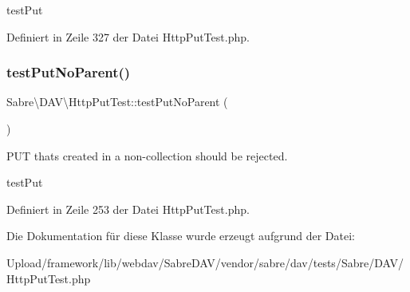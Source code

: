 test\+Put 

Definiert in Zeile 327 der Datei Http\+Put\+Test.\+php.

\mbox{\label{class_sabre_1_1_d_a_v_1_1_http_put_test_ac2a7f4b6ffdf26168d1862c2ba65669e}} 
\subsubsection{\texorpdfstring{test\+Put\+No\+Parent()}{testPutNoParent()}}
{\footnotesize\ttfamily Sabre\textbackslash{}\+D\+A\+V\textbackslash{}\+Http\+Put\+Test\+::test\+Put\+No\+Parent (\begin{DoxyParamCaption}{ }\end{DoxyParamCaption})}

P\+UT thats created in a non-\/collection should be rejected.

test\+Put 

Definiert in Zeile 253 der Datei Http\+Put\+Test.\+php.



Die Dokumentation für diese Klasse wurde erzeugt aufgrund der Datei\+:\begin{DoxyCompactItemize}
\item 
Upload/framework/lib/webdav/\+Sabre\+D\+A\+V/vendor/sabre/dav/tests/\+Sabre/\+D\+A\+V/Http\+Put\+Test.\+php\end{DoxyCompactItemize}
